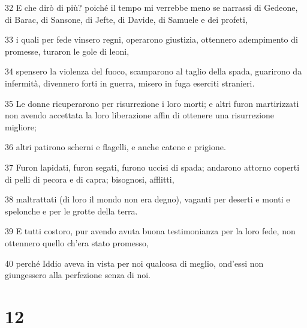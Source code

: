 \par 32 E che dirò di più? poiché il tempo mi verrebbe meno se narrassi di Gedeone, di Barac, di Sansone, di Jefte, di Davide, di Samuele e dei profeti,
\par 33 i quali per fede vinsero regni, operarono giustizia, ottennero adempimento di promesse, turaron le gole di leoni,
\par 34 spensero la violenza del fuoco, scamparono al taglio della spada, guarirono da infermità, divennero forti in guerra, misero in fuga eserciti stranieri.
\par 35 Le donne ricuperarono per risurrezione i loro morti; e altri furon martirizzati non avendo accettata la loro liberazione affin di ottenere una risurrezione migliore;
\par 36 altri patirono scherni e flagelli, e anche catene e prigione.
\par 37 Furon lapidati, furon segati, furono uccisi di spada; andarono attorno coperti di pelli di pecora e di capra; bisognosi, afflitti,
\par 38 maltrattati (di loro il mondo non era degno), vaganti per deserti e monti e spelonche e per le grotte della terra.
\par 39 E tutti costoro, pur avendo avuta buona testimonianza per la loro fede, non ottennero quello ch'era stato promesso,
\par 40 perché Iddio aveva in vista per noi qualcosa di meglio, ond'essi non giungessero alla perfezione senza di noi.

\chapter{12}

